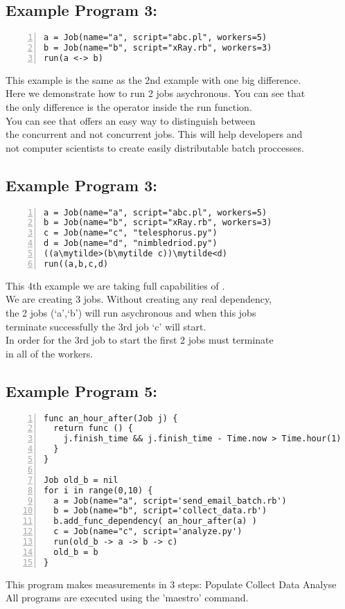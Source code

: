 \subsection*{Example Program 3:}
\begin{Verbatim}[numbers=left]
a = Job(name="a", script="abc.pl", workers=5)
b = Job(name="b", script="xRay.rb", workers=3)
run(a <-> b)
\end{Verbatim}

This example is the same as the 2nd example with one big difference.\\
Here we demonstrate how to run 2 jobs asychronous. You can see that\\
the only difference is the operator inside the run function.\\

You can see that \lang{} offers an easy way to distinguish between\\
the concurrent and not concurrent jobs. This will help developers and\\
not computer scientists to create easily distributable batch proccesses.\\

\subsection*{Example Program 3:}
\begin{Verbatim}[numbers=left,commandchars=\\\{\}]
a = Job(name="a", script="abc.pl", workers=5)
b = Job(name="b", script="xRay.rb", workers=3)
c = Job(name="c", "telesphorus.py")
d = Job(name="d", "nimbledriod.py")
((a\mytilde>(b\mytilde c))\mytilde<d)
run((a,b,c,d)
\end{Verbatim}

This 4th example we are taking full capabilities of \lang{}.\\
We are creating 3 jobs. Without creating any real dependency,\\
the 2 jobs (`a',`b') will run asychronous and when this jobs\\
terminate successfully the 3rd job `c' will start.\\
In order for the 3rd job to start the first 2 jobs must terminate\\
in all of the workers.\\

\subsection*{Example Program 5:}
\begin{Verbatim}[numbers=left]
func an_hour_after(Job j) {
  return func () {
    j.finish_time && j.finish_time - Time.now > Time.hour(1)
  }
}

Job old_b = nil
for i in range(0,10) {
  a = Job(name="a", script='send_email_batch.rb')
  b = Job(name="b", script='collect_data.rb')
  b.add_func_dependency( an_hour_after(a) )
  c = Job(name="c", script='analyze.py')
  run(old_b -> a -> b -> c)
  old_b = b
}
\end{Verbatim}
This program makes measurements in 3 steps:
Populate
Collect Data
Analyse
\\

All programs are executed using the 'maestro' command.
\\

